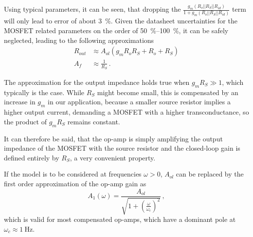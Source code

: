 \documentclass[12pt]{book}
\begin{document}
Using typical parameters, it can be seen, that dropping the $\frac{g_m \left(R_o || R_S || R_{id}\right)}{1 + g_m \left(R_o || R_S || R_{id}\right)}$ term will only lead to error of about \qty{3}{\percent}. Given the datasheet uncertainties for the MOSFET related parameters on the order of \qtyrange{50}{100}{\percent}, it can be safely neglected, leading to the following approximations
\begin{align}
    R_{out} &\approx A_{ol} \left(g_m R_o R_S + R_o + R_S \right)\\
    A_f &\approx \frac{1}{R_S} \,. \nonumber
\end{align}

The approximation for the output impedance holds true when $g_m R_S \gg 1$, which typically is the case. While $R_S$ might become small, this is compensated by an increase in $g_m$ in our application, because a smaller source resistor implies a higher output current, demanding a MOSFET with a higher transconductance, so the product of $g_m R_S$ remains constant.

It can therefore be said, that the op-amp is simply amplifying the output impedance of the MOSFET with the source resistor and the closed-loop gain is defined entirely by $R_S$, a very convenient property.

If the model is to be considered at frequencies $\omega > 0$, $A_{ol}$ can be replaced by the first order approximation of the op-amp gain as
\begin{equation}
    A_1 (\omega) = \frac{A_{ol}}{\sqrt{1 + \left(\frac{\omega}{\omega_c}\right)^2}}\,,
\end{equation}
which is valid for most compensated op-amps, which have a dominant pole at $\omega_c \approx \qty{1}{\Hz}$.
\end{document}
